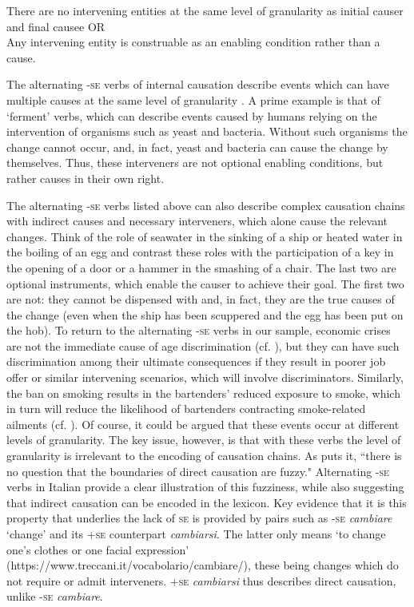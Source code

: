\documentclass[output=paper,colorlinks,citecolor=brown
]{langscibook}
\begin{document}
\ea \label{bentley_example_13}
    \ea \label{bentley_example_13a}
    \glt There are no intervening entities at the same level of granularity as initial causer and final causee 	OR  \\
    \ex \label{bentley_example_13b}
    \glt Any intervening entity is construable as an enabling condition rather than a cause.  \\
    \z
\z

The alternating -\textsc{se} verbs of internal causation describe events which can have multiple causes at the same level of granularity \citep{bentley2023internally}. A prime example is that of ‘ferment’ verbs, which can describe events caused by humans relying on the intervention of organisms such as yeast and bacteria. Without such organisms the change cannot occur, and, in fact, yeast and bacteria can cause the change by themselves. Thus, these interveners are not optional enabling conditions, but rather causes in their own right. 

The alternating -\textsc{se} verbs listed above can also describe complex causation chains with indirect causes and necessary interveners, which alone cause the relevant changes. Think of the role of seawater in the sinking of a ship or heated water in the boiling of an egg and contrast these roles with the participation of a key in the opening of a door or a hammer in the smashing of a chair. The last two are optional instruments, which enable the causer to achieve their goal. The first two are not: they cannot be dispensed with and, in fact, they are the true causes of the change (even when the ship has been scuppered and the egg has been put on the hob). To return to the alternating -\textsc{se} verbs in our sample, economic crises are not the immediate cause of age discrimination (cf. ), but they can have such discrimination among their ultimate consequences if they result in poorer job offer or similar intervening scenarios, which will involve discriminators. Similarly, the ban on smoking results in the bartenders’ reduced exposure to smoke, which in turn will reduce the likelihood of bartenders contracting smoke-related ailments (cf. ). Of course, it could be argued that these events occur at different levels of granularity. The key issue, however, is that with these verbs the level of granularity is irrelevant to the encoding of causation chains. As \citet[477]{kiparsky1997remarks} puts it, “there is no question that the boundaries of direct causation are fuzzy." Alternating -\textsc{se} verbs in Italian provide a clear illustration of this fuzziness, while also suggesting that indirect causation can be encoded in the lexicon. Key evidence that it is this property that underlies the lack of \textsc{se} is provided by pairs such as -\textsc{se} \textit{cambiare} ‘change’ and its +\textsc{se} counterpart \textit{cambiarsi}. The latter only means ‘to change one’s clothes or one facial expression’ (https://www.treccani.it/vocabolario/cambiare/), these being changes which do not require or admit interveners. +\textsc{se} \textit{cambiarsi} thus describes direct causation, unlike -\textsc{se} \textit{cambiare}. 
\end{document}
